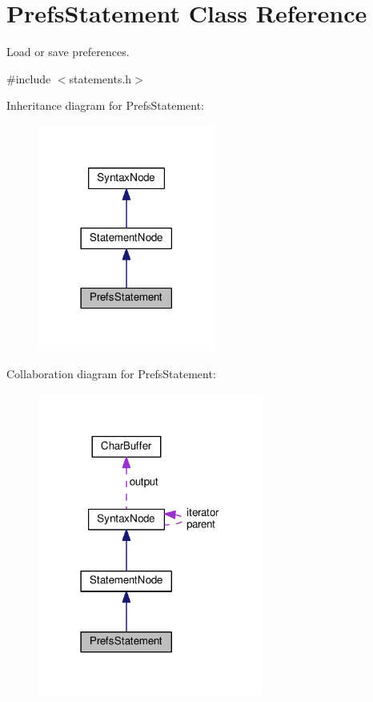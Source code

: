 \hypertarget{classPrefsStatement}{}\section{Prefs\+Statement Class Reference}
\label{classPrefsStatement}


Load or save preferences.  




{\ttfamily \#include $<$statements.\+h$>$}



Inheritance diagram for Prefs\+Statement\+:
\nopagebreak
\begin{figure}[H]
\begin{center}
\leavevmode
\includegraphics[width=165pt]{d8/d02/classPrefsStatement__inherit__graph}
\end{center}
\end{figure}


Collaboration diagram for Prefs\+Statement\+:
\nopagebreak
\begin{figure}[H]
\begin{center}
\leavevmode
\includegraphics[width=210pt]{d5/d8d/classPrefsStatement__coll__graph}
\end{center}
\end{figure}

